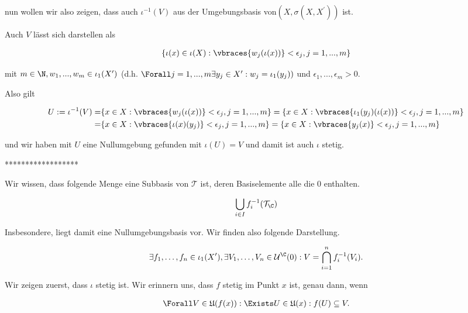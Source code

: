 \begin{solution}
\begin{enumerate}[label = (\arabic*)]
  nun wollen wir also zeigen, dass auch $\iota^{-1}(V)$ aus der Umgebungsbasis von$(X,\sigma(X,X^{\prime}))$ ist.

  Auch $V$ lässt sich darstellen als

  \begin{align*}
    \{\iota(x) \in \iota(X): \vbraces{w_{j}(\iota(x))}<\epsilon_j, j=1,...,m\}
  \end{align*}

  mit $m \in \N,w_1,...,w_m \in \iota_1(X^{\prime})$ (d.h. $\Forall j = 1,...,m \exists y_j \in X^{\prime} : w_j = \iota_1(y_j))$ und $\epsilon_1,...,\epsilon_m > 0$.

  Also gilt

  \begin{align*}
    U := \iota^{-1}(V) =& \{x \in X: \vbraces{w_{j}(\iota(x))}<\epsilon_j, j=1,...,m\} = \{x \in X: \vbraces{\iota_1(y_{j})(\iota(x))}<\epsilon_j, j=1,...,m\} \\
    =& \{x \in X: \vbraces{\iota(x)(y_j)}<\epsilon_j, j=1,...,m\} = \{x \in X: \vbraces{y_j(x)}<\epsilon_j, j=1,...,m\}
  \end{align*}

  und wir haben mit $U$ eine Nullumgebung gefunden mit $\iota(U) = V$ und damit ist auch $\iota$ stetig.

  ******************

  Wir wissen, dass folgende Menge eine Subbasis von $\mathcal{T}$ ist, deren Basiselemente alle die $0$ enthalten.

  \begin{align*}
    \bigcup_{i \in I}f_i^{-1}(\mathcal{T}_{\C})
  \end{align*}

  Insbesondere, liegt damit eine Nullumgebungsbasis vor.
  Wir finden also folgende Darstellung.

  \begin{align*}
    \exists f_1,\dots,f_n \in \iota_1(X^{\prime}), \exists V_1,\dots,V_n \in \mathcal{U}^{\C}(0):
    V = \bigcap_{i=1}^n f_i^{-1}(V_i).
  \end{align*}

  Wir zeigen zuerst, dass $\iota$ stetig ist.
  Wir erinnern uns, dass $f$ stetig im Punkt $x$ ist, genau dann, wenn

  \begin{align*}
    \Forall V \in \mathfrak{U}(f(x)):
    \Exists U \in \mathfrak{U}(x):
    f(U) \subseteq V.
  \end{align*}


\end{enumerate}
\end{solution}
